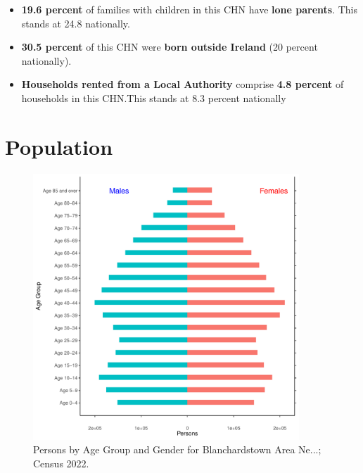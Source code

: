 \documentclass{article}
\begin{document}
\begin{itemize}
\item \textbf{19.6 percent} of families with children in this CHN have \textbf{lone parents}. This stands at 24.8 nationally.

\item \textbf{30.5 percent} of this CHN were \textbf{born outside Ireland} (20 percent nationally).

\item \textbf{Households rented from a Local Authority} comprise \textbf{4.8 percent} of households in this CHN.This stands at 8.3 percent nationally

\end{itemize}

\pagebreak

\section{Population} 
\label{sect:Pop}

\begin{figure}[h]
	\centering
	\includegraphics[width = 100mm]{../figures/PyramidPlot.pdf}
	\caption{Persons by Age Group and Gender for Blanchardstown Area Ne...; Census 2022.}
	\label{fig:2ae19629-1a6a-13a3-e055-000000000001}
	\end{figure}
\end{document}
